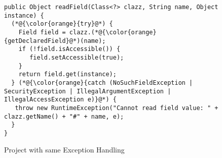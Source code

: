 \begin{figure}[htbp]
	\centering
\begin{lstlisting}[]
public Object readField(Class<?> clazz, String name, Object instance) {
  (*@{\color{orange}{try}@*) {
    Field field = clazz.(*@{\color{orange}{getDeclaredField}@*)(name);
    if (!field.isAccessible()) {
       field.setAccessible(true);
    }
    return field.get(instance);
  } (*@{\color{orange}{catch (NoSuchFieldException | SecurityException | IllegalArgumentException | IllegalAccessException e)}@*) {
   throw new RuntimeException("Cannot read field value: " + clazz.getName() + "#" + name, e);
  }
}
\end{lstlisting}
        \vspace{-16pt}
        \caption{Project  with same Exception Handling}
        \label{fig:example3}
\end{figure}
